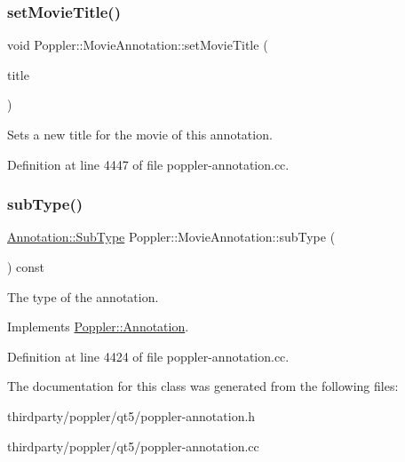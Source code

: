 \subsubsection{\texorpdfstring{set\+Movie\+Title()}{setMovieTitle()}}
{\footnotesize\ttfamily void Poppler\+::\+Movie\+Annotation\+::set\+Movie\+Title (\begin{DoxyParamCaption}\item[{const Q\+String \&}]{title }\end{DoxyParamCaption})}

Sets a new title for the movie of this annotation. 

Definition at line 4447 of file poppler-\/annotation.\+cc.

\mbox{\label{class_poppler_1_1_movie_annotation_ab4443ef588d984f52fcb93669da3e88d}} 
\subsubsection{\texorpdfstring{sub\+Type()}{subType()}}
{\footnotesize\ttfamily \hyperlink{class_poppler_1_1_annotation_a2d592999c330949d64679cfa9e81113f}{Annotation\+::\+Sub\+Type} Poppler\+::\+Movie\+Annotation\+::sub\+Type (\begin{DoxyParamCaption}{ }\end{DoxyParamCaption}) const\hspace{0.3cm}{\ttfamily [virtual]}}

The type of the annotation. 

Implements \hyperlink{class_poppler_1_1_annotation_aef7fa1532193b41fbeba6e577579d984}{Poppler\+::\+Annotation}.



Definition at line 4424 of file poppler-\/annotation.\+cc.



The documentation for this class was generated from the following files\+:\begin{DoxyCompactItemize}
\item 
thirdparty/poppler/qt5/poppler-\/annotation.\+h\item 
thirdparty/poppler/qt5/poppler-\/annotation.\+cc\end{DoxyCompactItemize}
